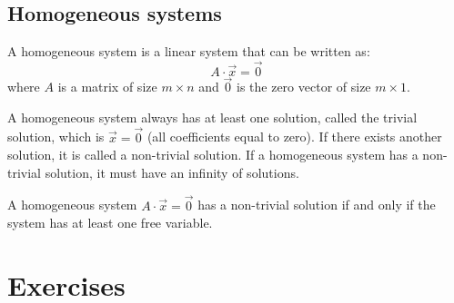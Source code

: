 \subsection{Homogeneous systems}
\begin{definition}
    A homogeneous system is a linear system that can be written as:
    \[
        A \cdot \vec{x} = \vec{0}
    \]
    where $A$ is a matrix of size $m \times n$ and $\vec{0}$ is the zero vector of size $m \times 1$.
\end{definition}
A homogeneous system always has at least one solution, called the trivial solution, which is $\vec{x} = \vec{0}$ (all coefficients equal to zero). If there exists another solution, it is called a non-trivial solution. If a homogeneous system has a non-trivial solution, it must have an infinity of solutions.
\begin{theorem}
    A homogeneous system $A \cdot \vec{x} = \vec{0}$ has a non-trivial solution if and only if the system has at least one free variable.
\end{theorem}

\section{Exercises}
